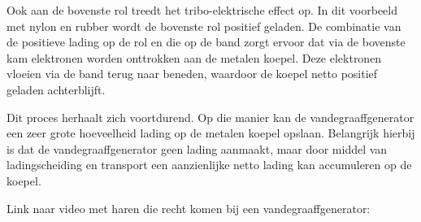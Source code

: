 \documentclass{ximera}
\begin{document}
\begin{example}[foldable=true,title={Toepassing: vandegraaffgenerator}]
    Ook aan de bovenste rol treedt het tribo-elektrische effect op. In dit voorbeeld met nylon en rubber wordt de bovenste rol positief geladen. De combinatie van de positieve lading op de rol en die op de band zorgt ervoor dat via de bovenste kam elektronen worden onttrokken aan de metalen koepel. Deze elektronen vloeien via de band terug naar beneden, waardoor de koepel netto positief geladen achterblijft.

    Dit proces herhaalt zich voortdurend. Op die manier kan de vandegraaffgenerator een zeer grote hoeveelheid lading op de metalen koepel opslaan. Belangrijk hierbij is dat de vandegraaffgenerator geen lading aanmaakt, maar door middel van ladingscheiding en transport een aanzienlijke netto lading kan accumuleren op de koepel.
\end{example}

\begin{onlineOnly}
    Link naar video met haren die recht komen bij een vandegraaffgenerator: 
\end{onlineOnly}
\end{document}
